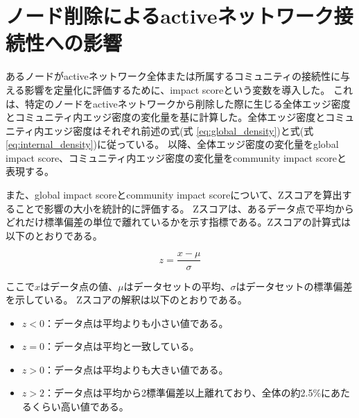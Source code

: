 \section{ノード削除によるactiveネットワーク接続性への影響}

あるノードがactiveネットワーク全体または所属するコミュニティの接続性に与える影響を定量化に評価するために、impact scoreという変数を導入した。
これは、特定のノードをactiveネットワークから削除した際に生じる全体エッジ密度とコミュニティ内エッジ密度の変化量を基に計算した。全体エッジ密度とコミュニティ内エッジ密度はそれぞれ前述の式(式 \ref{eq:global_density})と式(式 \ref{eq:internal_density})に従っている。
以降、全体エッジ密度の変化量をglobal impact score、コミュニティ内エッジ密度の変化量をcommunity impact scoreと表現する。

また、global impact scoreとcommunity impact scoreについて、Zスコアを算出することで影響の大小を統計的に評価する。
Zスコアは、あるデータ点で平均からどれだけ標準偏差の単位で離れているかを示す指標である。Zスコアの計算式は以下のとおりである。

\[
z = \frac{x - \mu}{\sigma}
\]

ここで$x$はデータ点の値、$\mu$はデータセットの平均、$\sigma$はデータセットの標準偏差を示している。
Zスコアの解釈は以下のとおりである。
\begin{itemize}
    \item \( z < 0 \)：データ点は平均よりも小さい値である。
    \item \( z = 0 \)：データ点は平均と一致している。
    \item \( z > 0 \)：データ点は平均よりも大きい値である。
    \item \( z > 2 \)：データ点は平均から2標準偏差以上離れており、全体の約2.5\%にあたるくらい高い値である。
\end{itemize}


